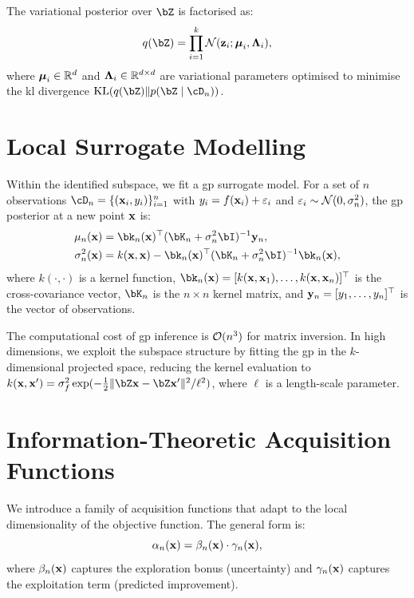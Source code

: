 The variational posterior over $\bZ$ is factorised as:
\begin{equation}
    q(\bZ) = \prod_{i=1}^{k} \cN(\bz_i; \bmu_i, \bLambda_i),
    \label{eq:variational-posterior}
\end{equation}
where $\boldsymbol{\mu}_i \in \mathbb{R}^d$ and $\boldsymbol{\Lambda}_i \in \mathbb{R}^{d \times d}$ are variational
parameters optimised to minimise the \gls{kl} divergence
$\KL(q(\bZ) \| p(\bZ \mid \cD_n))$.

\section{Local Surrogate Modelling}
\label{sec:local-surrogate}

Within the identified subspace, we fit a \gls{gp} surrogate model.  For a set
of $n$ observations $\cD_n = \{(\bx_i, y_i)\}_{i=1}^n$ with
$y_i = f(\mathbf{x}_i) + \varepsilon_i$ and $\varepsilon_i \sim \mathcal{N}(0, \sigma_n^2)$,
the \gls{gp} posterior at a new point $\mathbf{x}$ is:
\begin{align}
    \mu_n(\bx) &= \bk_n(\bx)^\top (\bK_n + \sigma_n^2 \bI)^{-1} \by_n,
    \label{eq:gp-mean} \\
    \sigma_n^2(\bx) &= k(\bx, \bx) - \bk_n(\bx)^\top (\bK_n + \sigma_n^2 \bI)^{-1} \bk_n(\bx),
    \label{eq:gp-variance}
\end{align}
where $k(\cdot, \cdot)$ is a kernel function,
$\bk_n(\bx) = [k(\bx, \bx_1), \ldots, k(\bx, \bx_n)]^\top$ is the
cross-covariance vector, $\bK_n$ is the $n \times n$ kernel matrix, and
$\mathbf{y}_n = [y_1, \ldots, y_n]^\top$ is the vector of observations.

The computational cost of \gls{gp} inference is $\mathcal{O}(n^3)$ for matrix
inversion.  In high dimensions, we exploit the subspace structure by fitting the
\gls{gp} in the $k$-dimensional projected space, reducing the kernel evaluation
to $k(\bx, \bx') = \sigma_f^2 \exp(-\frac{1}{2} \| \bZ\bx - \bZ\bx' \|^2 / \ell^2)$,
where $\ell$ is a length-scale parameter.

\section{Information-Theoretic Acquisition Functions}
\label{sec:acquisition-functions}

We introduce a family of acquisition functions that adapt to the local
dimensionality of the objective function.  The general form is:
\begin{equation}
    \alpha_n(\mathbf{x}) = \beta_n(\mathbf{x}) \cdot \gamma_n(\mathbf{x}),
    \label{eq:acquisition-general}
\end{equation}
where $\beta_n(\mathbf{x})$ captures the exploration bonus (uncertainty) and
$\gamma_n(\mathbf{x})$ captures the exploitation term (predicted improvement).

